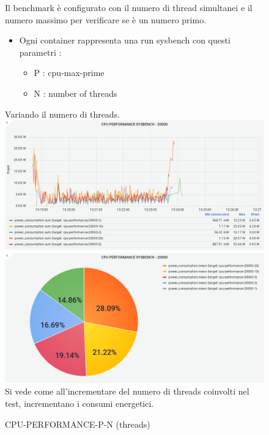 \documentclass[a4paper, 11pt]{article}
\begin{document}
\begin{figure}[h]
\caption{CPU-PERFORMANCE-P-N (threads)}
Il benchmark è configurato con il numero di thread simultanei e il numero massimo per verificare se è un numero primo.
\begin{flushleft}
\begin{itemize}
\item Ogni container rappresenta una run sysbench con questi parametri :
\begin{itemize}
\item P : cpu-max-prime
\item N : number of threads
\end{itemize}
\end{itemize}
Variando il numero di threads. 
\includegraphics[scale=0.4]{image10}
\includegraphics[scale=0.4]{image38}
\\ Si vede come all'incrementare del numero di threads coinvolti nel test, incrementano i consumi energetici.
\end{flushleft}
\end{figure}
\end{document}
